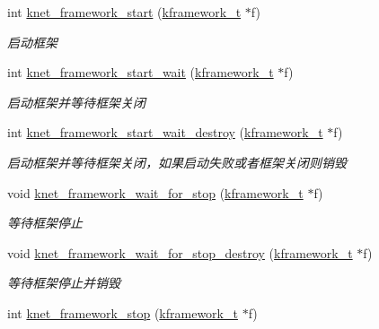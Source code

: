 \begin{DoxyCompactItemize}
int \hyperlink{a00110_gae2bea4af82f4cdce2f4efbf68aa8054c_gae2bea4af82f4cdce2f4efbf68aa8054c}{knet\+\_\+framework\+\_\+start} (\hyperlink{a00054_a3195a3be35782fc1efb920c811be111d_a3195a3be35782fc1efb920c811be111d}{kframework\+\_\+t} $\ast$f)
\begin{DoxyCompactList}\small\item\em 启动框架 \end{DoxyCompactList}\item 
int \hyperlink{a00110_ga5eda19f3b32bb48578cf735e877aac2e_ga5eda19f3b32bb48578cf735e877aac2e}{knet\+\_\+framework\+\_\+start\+\_\+wait} (\hyperlink{a00054_a3195a3be35782fc1efb920c811be111d_a3195a3be35782fc1efb920c811be111d}{kframework\+\_\+t} $\ast$f)
\begin{DoxyCompactList}\small\item\em 启动框架并等待框架关闭 \end{DoxyCompactList}\item 
int \hyperlink{a00110_gab44f183a42eda626fe6ec1e6d35bb859_gab44f183a42eda626fe6ec1e6d35bb859}{knet\+\_\+framework\+\_\+start\+\_\+wait\+\_\+destroy} (\hyperlink{a00054_a3195a3be35782fc1efb920c811be111d_a3195a3be35782fc1efb920c811be111d}{kframework\+\_\+t} $\ast$f)
\begin{DoxyCompactList}\small\item\em 启动框架并等待框架关闭，如果启动失败或者框架关闭则销毁 \end{DoxyCompactList}\item 
void \hyperlink{a00110_gacff434cca9ce60fa5a3597348ee4360b_gacff434cca9ce60fa5a3597348ee4360b}{knet\+\_\+framework\+\_\+wait\+\_\+for\+\_\+stop} (\hyperlink{a00054_a3195a3be35782fc1efb920c811be111d_a3195a3be35782fc1efb920c811be111d}{kframework\+\_\+t} $\ast$f)
\begin{DoxyCompactList}\small\item\em 等待框架停止 \end{DoxyCompactList}\item 
void \hyperlink{a00110_ga5936d2ece03511c366b19bc7616ac8be_ga5936d2ece03511c366b19bc7616ac8be}{knet\+\_\+framework\+\_\+wait\+\_\+for\+\_\+stop\+\_\+destroy} (\hyperlink{a00054_a3195a3be35782fc1efb920c811be111d_a3195a3be35782fc1efb920c811be111d}{kframework\+\_\+t} $\ast$f)
\begin{DoxyCompactList}\small\item\em 等待框架停止并销毁 \end{DoxyCompactList}\item 
int \hyperlink{a00110_gac8f76fe72392bc5103b70fb5b3280839_gac8f76fe72392bc5103b70fb5b3280839}{knet\+\_\+framework\+\_\+stop} (\hyperlink{a00054_a3195a3be35782fc1efb920c811be111d_a3195a3be35782fc1efb920c811be111d}{kframework\+\_\+t} $\ast$f)

\end{DoxyCompactItemize}
